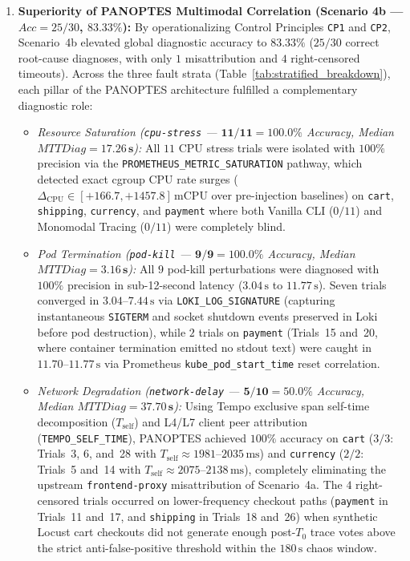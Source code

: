 \begin{enumerate}
    \item \textbf{Superiority of PANOPTES Multimodal Correlation (Scenario 4b --- $Acc = 25/30$, $83.33\%$):} By operationalizing Control Principles \texttt{CP1} and \texttt{CP2}, Scenario~4b elevated global diagnostic accuracy to $\mathbf{83.33\%}$ ($25/30$ correct root-cause diagnoses, with only $1$ misattribution and $4$ right-censored timeouts). Across the three fault strata (Table~\ref{tab:stratified_breakdown}), each pillar of the PANOPTES architecture fulfilled a complementary diagnostic role:
    \begin{itemize}
        \item \textit{Resource Saturation (\texttt{cpu-stress} --- $\mathbf{11/11 = 100.0\%}$ Accuracy, Median $MTTDiag = \mathbf{17.26\,\text{s}}$):} All $11$ CPU stress trials were isolated with $100\%$ precision via the \texttt{PROMETHEUS\_METRIC\_SATURATION} pathway, which detected exact cgroup CPU rate surges ($\Delta_{\text{CPU}} \in [+166.7, +1457.8]\,\text{mCPU}$ over pre-injection baselines) on \texttt{cart}, \texttt{shipping}, \texttt{currency}, and \texttt{payment} where both Vanilla CLI ($0/11$) and Monomodal Tracing ($0/11$) were completely blind.
        \item \textit{Pod Termination (\texttt{pod-kill} --- $\mathbf{9/9 = 100.0\%}$ Accuracy, Median $MTTDiag = \mathbf{3.16\,\text{s}}$):} All $9$ pod-kill perturbations were diagnosed with $100\%$ precision in sub-12-second latency ($3.04\,\text{s}$ to $11.77\,\text{s}$). Seven trials converged in $3.04\text{--}7.44\,\text{s}$ via \texttt{LOKI\_LOG\_SIGNATURE} (capturing instantaneous \texttt{SIGTERM} and socket shutdown events preserved in Loki before pod destruction), while $2$ trials on \texttt{payment} (Trials~15 and~20, where container termination emitted no stdout text) were caught in $11.70\text{--}11.77\,\text{s}$ via Prometheus \texttt{kube\_pod\_start\_time} reset correlation.
        \item \textit{Network Degradation (\texttt{network-delay} --- $\mathbf{5/10 = 50.0\%}$ Accuracy, Median $MTTDiag = \mathbf{37.70\,\text{s}}$):} Using Tempo exclusive span self-time decomposition ($T_{\text{self}}$) and L4/L7 client peer attribution (\texttt{TEMPO\_SELF\_TIME}), PANOPTES achieved $100\%$ accuracy on \texttt{cart} ($3/3$: Trials~3, 6, and~28 with $T_{\text{self}} \approx 1981\text{--}2035\,\text{ms}$) and \texttt{currency} ($2/2$: Trials~5 and~14 with $T_{\text{self}} \approx 2075\text{--}2138\,\text{ms}$), completely eliminating the upstream \texttt{frontend-proxy} misattribution of Scenario~4a. The $4$ right-censored trials occurred on lower-frequency checkout paths (\texttt{payment} in Trials~11 and~17, and \texttt{shipping} in Trials~18 and~26) when synthetic Locust cart checkouts did not generate enough post-$T_0$ trace votes above the strict anti-false-positive threshold within the $180\,\text{s}$ chaos window.
    \end{itemize}
\end{enumerate}

